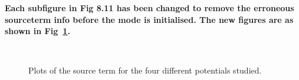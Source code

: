 \textbf{Each subfigure in Fig 8.11 has been changed to remove the erroneous sourceterm info before
the mode is initialised. The new figures are as shown in Fig~\ref{fig:newsrccmp}.
}

\begin{figure}[htbp]
\centering%
\qquad%
\\%
\qquad%
\caption[Source Term for the Four Potentials]{Plots of the source
term for the
four different potentials studied.}
\label{fig:newsrccmp}
\end{figure}

